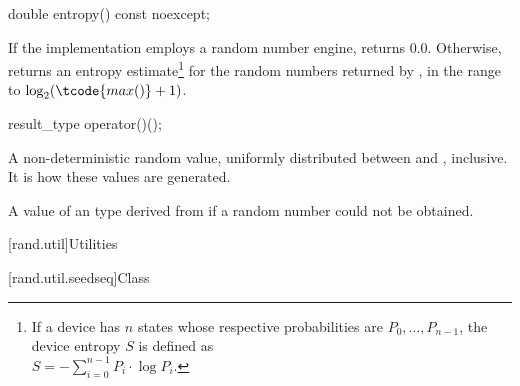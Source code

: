 %
\begin{itemdecl}
double entropy() const noexcept;
\end{itemdecl}

\begin{itemdescr}
\pnum\returns If the implementation employs a random number engine,
 returns $0.0$.
 Otherwise, returns an entropy estimate\footnote{If a device has $n$ states
   whose respective probabilities are
   $ P_0, \ldots, P_{n-1} $,
   the device entropy $S$ is defined as\\
   $ S = - \sum_{i=0}^{n-1} P_i \cdot \log P_i $.}
 for the random numbers returned by ,
 in the range
 to
   $\log_2( \tcode{max()}+1)$.
\end{itemdescr}

%
\begin{itemdecl}
result_type operator()();
\end{itemdecl}

\begin{itemdescr}
\pnum\returns A non-deterministic random value,
 uniformly distributed
 between  and ,
 inclusive.
 It is 
 how these values are generated.

\pnum
\throws A value of an 
 type derived from 
 if a random number could not be obtained.
\end{itemdescr}




[rand.util]{Utilities}%
%


[rand.util.seedseq]{Class }%

